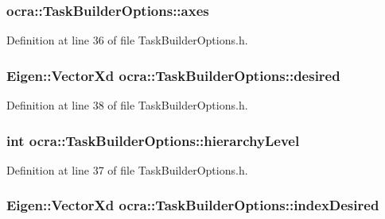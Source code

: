 \subsubsection[{\texorpdfstring{axes}{axes}}]{ ocra\+::\+Task\+Builder\+Options\+::axes}\hypertarget{classocra_1_1TaskBuilderOptions_ad29bb1310906e4618c8132dd3cea771c}{}\label{classocra_1_1TaskBuilderOptions_ad29bb1310906e4618c8132dd3cea771c}


Definition at line 36 of file Task\+Builder\+Options.\+h.

\subsubsection[{\texorpdfstring{desired}{desired}}]{\setlength{\rightskip}{0pt plus 5cm}Eigen\+::\+Vector\+Xd ocra\+::\+Task\+Builder\+Options\+::desired}\hypertarget{classocra_1_1TaskBuilderOptions_a55e98de13c8eaf3f2ace1778034d1466}{}\label{classocra_1_1TaskBuilderOptions_a55e98de13c8eaf3f2ace1778034d1466}


Definition at line 38 of file Task\+Builder\+Options.\+h.

\subsubsection[{\texorpdfstring{hierarchy\+Level}{hierarchyLevel}}]{\setlength{\rightskip}{0pt plus 5cm}int ocra\+::\+Task\+Builder\+Options\+::hierarchy\+Level}\hypertarget{classocra_1_1TaskBuilderOptions_ad32edcc41af7b2aab2d3b66c7f866d75}{}\label{classocra_1_1TaskBuilderOptions_ad32edcc41af7b2aab2d3b66c7f866d75}


Definition at line 37 of file Task\+Builder\+Options.\+h.

\subsubsection[{\texorpdfstring{index\+Desired}{indexDesired}}]{\setlength{\rightskip}{0pt plus 5cm}Eigen\+::\+Vector\+Xd ocra\+::\+Task\+Builder\+Options\+::index\+Desired}\hypertarget{classocra_1_1TaskBuilderOptions_ade41a041d05ccafcf6c5de4bcedd13e1}{}\label{classocra_1_1TaskBuilderOptions_ade41a041d05ccafcf6c5de4bcedd13e1}


